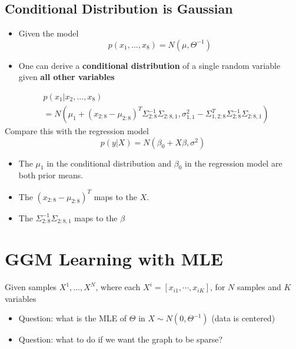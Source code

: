 \documentclass[10pt]{article}
\begin{document}
\subsection*{Conditional Distribution is Gaussian}
\begin{itemize}
	\item Given the model
	\[p(x_1, \dots, x_8) = N(\mu, \Theta^{-1})\]
    \item One can derive a \textbf{conditional distribution} of a single random variable given \textbf{all other variables}
\end{itemize}
\begin{align*}
    &p(x_1 | x_2, \dots, x_8) \\
    &= N \left(\mu_1 + (x_{2:8} - \mu_{2:8})^T \Sigma_{2:8}^{-1} \Sigma_{2:8, 1}, \sigma_{1, 1}^2 - \Sigma_{1, 2:8}^T \Sigma_{2:8}^{-1} \Sigma_{2:8, 1}\right)
\end{align*}
Compare this with the regression model
\[p(y | X) = N(\beta_0 + X\beta, \sigma^2)\]
\begin{itemize}
	\item The $\mu_1$ in the conditional distribution and $\beta_0$ in the regression model are both prior means.
	\item The $(x_{2:8} - \mu_{2:8})^T$ maps to the $X$.
	\item The $\Sigma_{2:8}^{-1} \Sigma_{2:8, 1}$ maps to the $\beta$
\end{itemize}

\section*{GGM Learning with MLE}
Given samples $X^1, \dots, X^N$, where each $X^i = [x_{i1}, \cdots, x_{iK}]$, for $N$ samples and $K$ variables
\begin{itemize}
	\item Question: what is the MLE of $\Theta$ in $X \sim N(0, \Theta^{-1})$ (data is centered)
	\item Question: what to do if we want the graph to be sparse?
\end{itemize}
\end{document}
